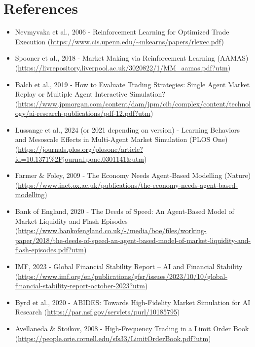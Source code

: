 \documentclass[11pt]{article}
\begin{document}
\section*{References}

\begin{itemize}[leftmargin=2em]
    \item Nevmyvaka et al., 2006 - Reinforcement Learning for Optimized Trade Execution (\url{https://www.cis.upenn.edu/~mkearns/papers/rlexec.pdf})

    \item Spooner et al., 2018 - Market Making via Reinforcement Learning (AAMAS) (\url{https://livrepository.liverpool.ac.uk/3020822/1/MM_aamas.pdf?utm})

    \item Balch et al., 2019 - How to Evaluate Trading Strategies: Single Agent Market Replay or Multiple Agent Interactive Simulation? (\url{https://www.jpmorgan.com/content/dam/jpm/cib/complex/content/technology/ai-research-publications/pdf-12.pdf?utm})

    \item Lussange et al., 2024 (or 2021 depending on version) - Learning Behaviors and Mesoscale Effects in Multi-Agent Market Simulation (PLOS One) (\url{https://journals.plos.org/plosone/article?id=10.1371%2Fjournal.pone.0301141&utm})

    \item Farmer \& Foley, 2009 - The Economy Needs Agent-Based Modelling (Nature) (\url{https://www.inet.ox.ac.uk/publications/the-economy-needs-agent-based-modelling})

    \item Bank of England, 2020 - The Deeds of Speed: An Agent-Based Model of Market Liquidity and Flash Episodes (\url{https://www.bankofengland.co.uk/-/media/boe/files/working-paper/2018/the-deeds-of-speed-an-agent-based-model-of-market-liquidity-and-flash-episodes.pdf?utm})

    \item IMF, 2023 - Global Financial Stability Report – AI and Financial Stability (\url{https://www.imf.org/en/publications/gfsr/issues/2023/10/10/global-financial-stability-report-october-2023?utm})

    \item Byrd et al., 2020 - ABIDES: Towards High-Fidelity Market Simulation for AI Research (\url{https://par.nsf.gov/servlets/purl/10185795})

    \item Avellaneda \& Stoikov, 2008 - High-Frequency Trading in a Limit Order Book (\url{https://people.orie.cornell.edu/sfs33/LimitOrderBook.pdf?utm})
\end{itemize}
\end{document}

